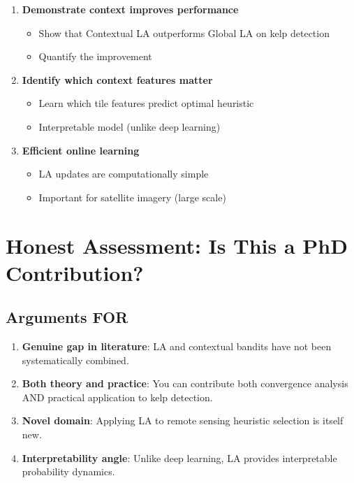 \documentclass[11pt]{article}
\begin{document}
\begin{enumerate}
  \item \textbf{Demonstrate context improves performance}
  \begin{itemize}
    \item Show that Contextual LA outperforms Global LA on kelp detection
    \item Quantify the improvement
  \end{itemize}

  \item \textbf{Identify which context features matter}
  \begin{itemize}
    \item Learn which tile features predict optimal heuristic
    \item Interpretable model (unlike deep learning)
  \end{itemize}

  \item \textbf{Efficient online learning}
  \begin{itemize}
    \item LA updates are computationally simple
    \item Important for satellite imagery (large scale)
  \end{itemize}
\end{enumerate}

\section{Honest Assessment: Is This a PhD Contribution?}

\subsection{Arguments FOR}

\begin{enumerate}
  \item \textbf{Genuine gap in literature}: LA and contextual bandits have not been systematically combined.

  \item \textbf{Both theory and practice}: You can contribute both convergence analysis AND practical application to kelp detection.

  \item \textbf{Novel domain}: Applying LA to remote sensing heuristic selection is itself new.

  \item \textbf{Interpretability angle}: Unlike deep learning, LA provides interpretable probability dynamics.
\end{enumerate}
\end{document}
